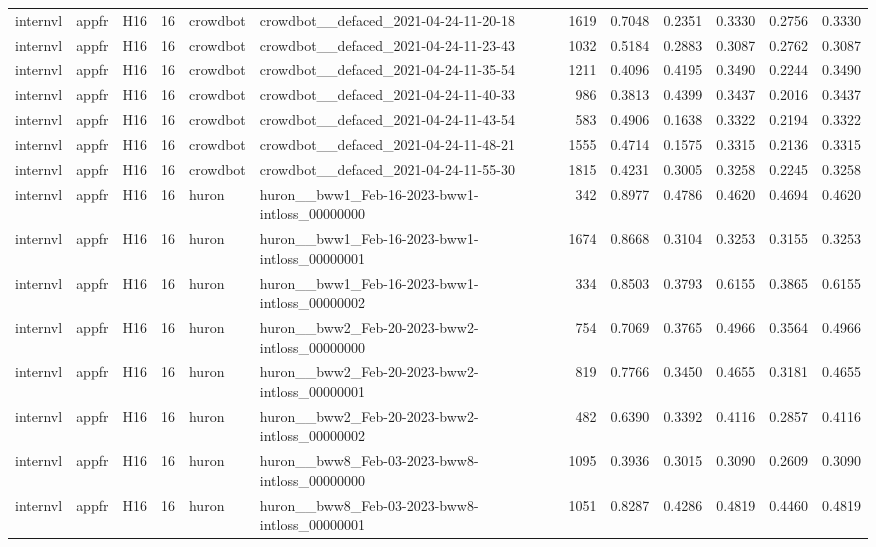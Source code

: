 \begin{table}[tbp]
\begin{tabular}{lllrllrrrrrr}
internvl & appfr & H16 & 16 & crowdbot & crowdbot\_\_defaced\_2021-04-24-11-20-18 & 1619 & 0.7048 & 0.2351 & 0.3330 & 0.2756 & 0.3330 \\
internvl & appfr & H16 & 16 & crowdbot & crowdbot\_\_defaced\_2021-04-24-11-23-43 & 1032 & 0.5184 & 0.2883 & 0.3087 & 0.2762 & 0.3087 \\
internvl & appfr & H16 & 16 & crowdbot & crowdbot\_\_defaced\_2021-04-24-11-35-54 & 1211 & 0.4096 & 0.4195 & 0.3490 & 0.2244 & 0.3490 \\
internvl & appfr & H16 & 16 & crowdbot & crowdbot\_\_defaced\_2021-04-24-11-40-33 & 986 & 0.3813 & 0.4399 & 0.3437 & 0.2016 & 0.3437 \\
internvl & appfr & H16 & 16 & crowdbot & crowdbot\_\_defaced\_2021-04-24-11-43-54 & 583 & 0.4906 & 0.1638 & 0.3322 & 0.2194 & 0.3322 \\
internvl & appfr & H16 & 16 & crowdbot & crowdbot\_\_defaced\_2021-04-24-11-48-21 & 1555 & 0.4714 & 0.1575 & 0.3315 & 0.2136 & 0.3315 \\
internvl & appfr & H16 & 16 & crowdbot & crowdbot\_\_defaced\_2021-04-24-11-55-30 & 1815 & 0.4231 & 0.3005 & 0.3258 & 0.2245 & 0.3258 \\
internvl & appfr & H16 & 16 & huron & huron\_\_bww1\_Feb-16-2023-bww1-intloss\_00000000 & 342 & 0.8977 & 0.4786 & 0.4620 & 0.4694 & 0.4620 \\
internvl & appfr & H16 & 16 & huron & huron\_\_bww1\_Feb-16-2023-bww1-intloss\_00000001 & 1674 & 0.8668 & 0.3104 & 0.3253 & 0.3155 & 0.3253 \\
internvl & appfr & H16 & 16 & huron & huron\_\_bww1\_Feb-16-2023-bww1-intloss\_00000002 & 334 & 0.8503 & 0.3793 & 0.6155 & 0.3865 & 0.6155 \\
internvl & appfr & H16 & 16 & huron & huron\_\_bww2\_Feb-20-2023-bww2-intloss\_00000000 & 754 & 0.7069 & 0.3765 & 0.4966 & 0.3564 & 0.4966 \\
internvl & appfr & H16 & 16 & huron & huron\_\_bww2\_Feb-20-2023-bww2-intloss\_00000001 & 819 & 0.7766 & 0.3450 & 0.4655 & 0.3181 & 0.4655 \\
internvl & appfr & H16 & 16 & huron & huron\_\_bww2\_Feb-20-2023-bww2-intloss\_00000002 & 482 & 0.6390 & 0.3392 & 0.4116 & 0.2857 & 0.4116 \\
internvl & appfr & H16 & 16 & huron & huron\_\_bww8\_Feb-03-2023-bww8-intloss\_00000000 & 1095 & 0.3936 & 0.3015 & 0.3090 & 0.2609 & 0.3090 \\
internvl & appfr & H16 & 16 & huron & huron\_\_bww8\_Feb-03-2023-bww8-intloss\_00000001 & 1051 & 0.8287 & 0.4286 & 0.4819 & 0.4460 & 0.4819 \\

\end{tabular}
\end{table}
